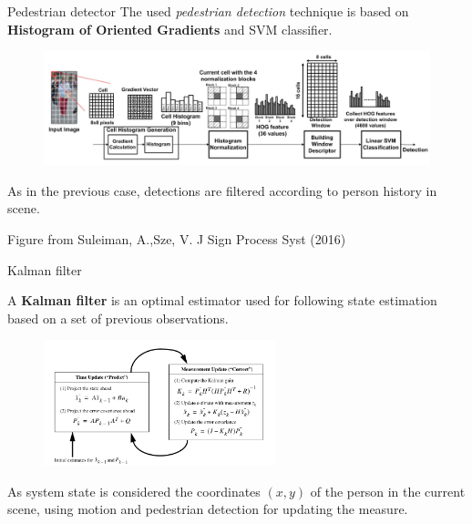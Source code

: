 \documentclass{beamer}
\begin{document}
\begin{tframe}{Pedestrian detector}
The used \emph{pedestrian detection} technique is based on \textbf{Histogram of Oriented Gradients} and SVM classifier.

\begin{figure}[h]
\centering
\includegraphics[width=1\textwidth]{images/hog_detector.jpg}
\end{figure}

As in the previous case, detections are filtered according to person history in scene.

\vspace{0.2cm}
\hfill {\tiny Figure from Suleiman, A.,Sze, V. J Sign Process Syst (2016)}
\end{tframe}


\begin{tframe}{Kalman filter}

A \textbf{Kalman filter} is an optimal estimator used for following state estimation based on a set of previous observations.
\begin{figure}[h]
\centering
\includegraphics[width=0.6\textwidth]{images/kalmaneq.jpg}
\end{figure}
As system state is considered the coordinates $(x, y)$ of the person in the current scene, using motion and pedestrian detection for updating the measure.
\end{tframe}
\end{document}
